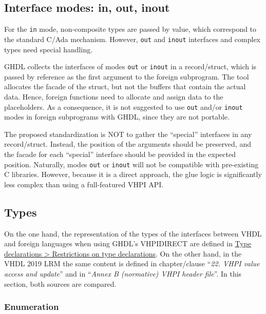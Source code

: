\documentclass[
]{article}
\begin{document}
\hypertarget{interface-modes-in-out-inout}{%
\subsection{Interface modes: in, out, inout}\label{interface-modes-in-out-inout}}

For the \texttt{in} mode, non-composite types are passed by value, which correspond to the standard C/Ada mechanism. However, \texttt{out} and \texttt{inout} interfaces and complex types need special handling.

GHDL collects the interfaces of modes \texttt{out} or \texttt{inout} in a record/struct, which is passed by reference as the first argument to the foreign subprogram. The tool allocates the facade of the struct, but not the buffers that contain the actual data. Hence, foreign functions need to allocate and assign data to the placeholders. As a consequence, it is not suggested to use \texttt{out} and/or \texttt{inout} modes in foreign subprograms with GHDL, since they are not portable.

The proposed standardization is NOT to gather the ``special'' interfaces in any record/struct. Instead, the position of the arguments should be preserved, and the facade for each ``special'' interface should be provided in the expected position. Naturally, modes \texttt{out} or \texttt{inout} will not be compatible with pre-existing C libraries. However, because it is a direct approach, the glue logic is significantly less complex than using a full-featured VHPI API.

\hypertarget{types}{%
\subsection{Types}\label{types}}

On the one hand, the representation of the types of the interfaces between VHDL and foreign languages when using GHDL's VHPIDIRECT are defined in \href{https://ghdl.github.io/ghdl-cosim/vhpidirect/declarations.html\#restrictions-on-type-declarations}{Type declarations \textgreater{} Restrictions on type declarations}. On the other hand, in the VHDL 2019 LRM the same content is defined in chapter/clause ``\emph{22. VHPI value access and update}'' and in ``\emph{Annex B (normative) VHPI header file}''. In this section, both sources are compared.

\hypertarget{enumeration}{%
\subsubsection{Enumeration}\label{enumeration}}
\end{document}
